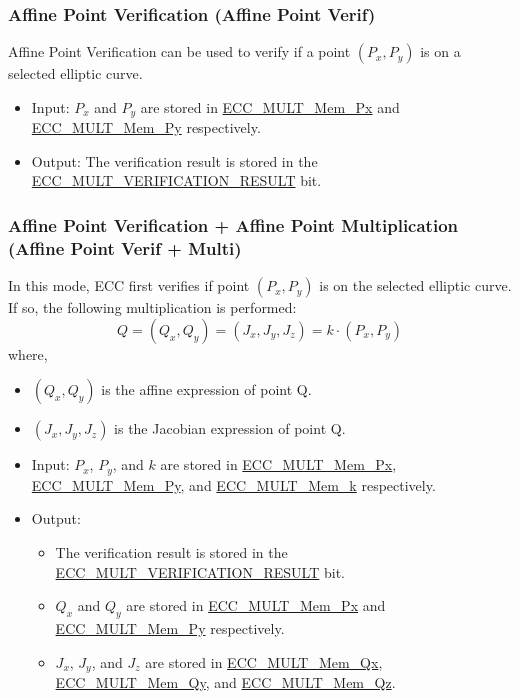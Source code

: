 \documentclass[main\_\_EN.tex]{subfiles}
\begin{document}
\subsubsection{Affine Point Verification (Affine Point Verif)}

Affine Point Verification can be used to verify if a point  $(P_x,P_y)$ is on a selected elliptic curve.

\begin{itemize}
    \item Input: $P_x$ and $P_y$ are stored in \hyperref[tab:ecc-memory]{ECC\_MULT\_Mem\_Px} and \hyperref[tab:ecc-memory]{ECC\_MULT\_Mem\_Py} respectively.
    \item Output: The verification result is stored in the \hyperref[fielddesc:ECCMULTVERIFICATIONRESULT]{ECC\_MULT\_VERIFICATION\_RESULT} bit.
\end{itemize}

\subsubsection{Affine Point Verification + Affine Point Multiplication (Affine Point Verif + Multi)}

In this mode, ECC first verifies if point $(P_x,P_y)$ is on the selected elliptic curve. If so, the following multiplication is performed:
\[
Q = (Q_x,Q_y) = (J_x,J_y,J_z) = k \cdot (P_x,P_y)
\]
where,
\begin{itemize}
    \item $(Q_x,Q_y)$ is the affine expression of point Q.
    \item $(J_x,J_y,J_z)$ is the Jacobian expression of point Q.
    \item Input: $P_x$, $P_y$, and $k$ are stored in \hyperref[tab:ecc-memory]{ECC\_MULT\_Mem\_Px}, \hyperref[tab:ecc-memory]{ECC\_MULT\_Mem\_Py}, and \hyperref[tab:ecc-memory]{ECC\_MULT\_Mem\_k} respectively.
    \item Output:
    \begin{itemize}
        \item The verification result is stored in the \hyperref[fielddesc:ECCMULTVERIFICATIONRESULT]{ECC\_MULT\_VERIFICATION\_RESULT} bit.
        \item $Q_x$ and $Q_y$ are stored in \hyperref[tab:ecc-memory]{ECC\_MULT\_Mem\_Px} and \hyperref[tab:ecc-memory]{ECC\_MULT\_Mem\_Py} respectively.
        \item $J_x$, $J_y$, and $J_z$ are stored in \hyperref[tab:ecc-memory]{ECC\_MULT\_Mem\_Qx}, \hyperref[tab:ecc-memory]{ECC\_MULT\_Mem\_Qy}, and \hyperref[tab:ecc-memory]{ECC\_MULT\_Mem\_Qz}.
    \end{itemize}
\end{itemize}
\end{document}
